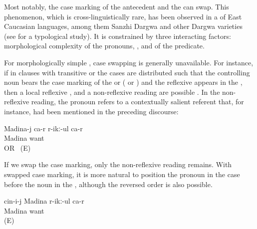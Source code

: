 Most notably, the case marking of the antecedent and the  can swap. This phenomenon, which is cross-linguistically rare, has been observed in a  of East Caucasian languages, among them Sanzhi Dargwa and other Dargwa varieties (see \citealp{Forker2014} for a typological study). It is constrained by three interacting factors: morphological complexity of the pronouns, , and  of the predicate.

For morphologically simple , case swapping is generally unavailable. For instance, if in clauses with transitive or  the cases are distributed such that the controlling noun bears the case marking of the  or  ( or ) and the reflexive appears in the , then a local reflexive ,  and a non-reflexive reading are possible . In the non-reflexive reading, the pronoun refers to a contextually salient referent that, for instance, had been mentioned in the preceding discourse:
%
\begin{exe}
	\ex	\label{ex:Madina likes / wants / loves herself. OR Madina likes / wants / loves her}
	\gll	Madina-j ca-r	r-ikː-ul	ca-r\\
		Madina		want	\\
	\glt	{} OR ~(E)
\end{exe}

If we swap the case marking, only the non-reflexive reading remains. With swapped case marking, it is more natural to position the pronoun in the  case before the noun in the  , although the reversed order is also possible.
%
\begin{exe}
	\ex	\label{ex:She likes / wants / loves Madina}
	\gll	cin-i-j	Madina r-ikː-ul	ca-r\\
			Madina want	\\
	\glt	{} (E)
\end{exe}

